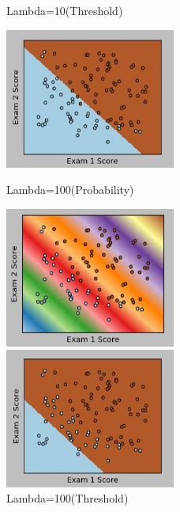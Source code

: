 \documentclass[12pt]{article}
\begin{document}
\begin{itemize}
\begin{figure}[h!]
\caption{Lambda=10(Threshold)}
\centering
\includegraphics[width=0.5\textwidth]{l10t}

\caption{Lambda=100(Probability)}
\centering
\includegraphics[width=0.5\textwidth]{l100p}

\caption{Lambda=100(Threshold)}
\centering
\includegraphics[width=0.5\textwidth]{l100t}
\end{figure}


\end{itemize}
\end{document}
